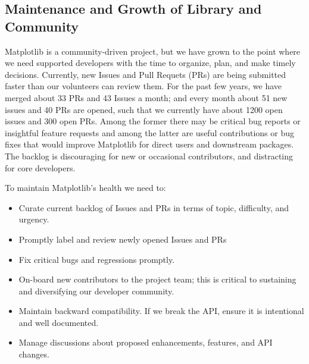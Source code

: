 \documentclass[11pt,letterpaper]{article}  %
\begin{document}
\subsection{Maintenance and Growth of Library and Community}


Matplotlib is a community-driven project, but we have grown to the
point where we need supported developers with the time to organize,
plan, and make timely decisions.  Currently, new Issues and Pull Requets (PRs) are
being submitted faster than our volunteers can review them.  For the past few years, we have 
merged about 33 PRs and 43 Issues a month; and every month about 51 new issues and 40 PRs are opened, 
such that we currently have about 1200 open issues and 300 open PRs.  Among the
former there may be critical bug reports or insightful feature
requests and among the latter are useful contributions or bug fixes
that would improve Matplotlib for direct users and downstream
packages.  The backlog is discouraging for new or occasional
contributors, and distracting for core developers.

To maintain Matplotlib's health we need to:

\begin{itemize}[noitemsep]
\item Curate current backlog of Issues and PRs in terms of topic, difficulty, and urgency.
\item Promptly label and review newly opened Issues and PRs
\item Fix critical bugs and regressions promptly.
\item On-board new contributors to the project team; this is critical to
  sustaining and diversifying our developer community.
\item Maintain backward compatibility.  If we break the API, ensure it
  is intentional and well documented.
\item Manage discussions about proposed enhancements, features, and API changes.
\end{itemize}
\end{document}
